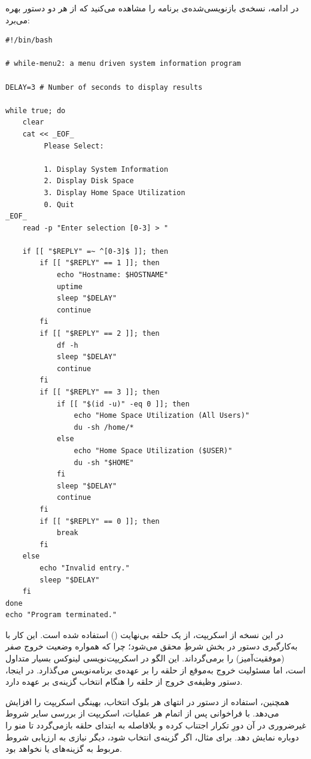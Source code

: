 در ادامه، نسخه‌ی بازنویسی‌شده‌ی برنامه  را مشاهده می‌کنید که از هر دو دستور بهره می‌برد:

\begin{latin}
\begin{lstlisting}
#!/bin/bash

# while-menu2: a menu driven system information program

DELAY=3 # Number of seconds to display results

while true; do
    clear
    cat << _EOF_
         Please Select:

         1. Display System Information
         2. Display Disk Space
         3. Display Home Space Utilization
         0. Quit
_EOF_
    read -p "Enter selection [0-3] > "

    if [[ "$REPLY" =~ ^[0-3]$ ]]; then
        if [[ "$REPLY" == 1 ]]; then
            echo "Hostname: $HOSTNAME"
            uptime
            sleep "$DELAY"
            continue
        fi
        if [[ "$REPLY" == 2 ]]; then
            df -h
            sleep "$DELAY"
            continue
        fi
        if [[ "$REPLY" == 3 ]]; then
            if [[ "$(id -u)" -eq 0 ]]; then
                echo "Home Space Utilization (All Users)"
                du -sh /home/*
            else
                echo "Home Space Utilization ($USER)"
                du -sh "$HOME"
            fi
            sleep "$DELAY"
            continue
        fi
        if [[ "$REPLY" == 0 ]]; then
            break
        fi
    else
        echo "Invalid entry."
        sleep "$DELAY"
    fi
done
echo "Program terminated."
\end{lstlisting}
\end{latin}

در این نسخه از اسکریپت، از یک حلقه بی‌نهایت () استفاده شده است. این کار با به‌کارگیری دستور  در بخش شرطِ  محقق می‌شود؛ چرا که  همواره وضعیت خروج صفر (موفقیت‌آمیز) را برمی‌گرداند. این الگو در اسکریپت‌نویسی لینوکس بسیار متداول است، اما مسئولیت خروج به‌موقع از حلقه را بر عهده‌ی برنامه‌نویس می‌گذارد. در اینجا، دستور  وظیفه‌ی خروج از حلقه را هنگام انتخاب گزینه‌ی  بر عهده دارد.

همچنین، استفاده از دستور  در انتهای هر بلوک انتخاب، بهینگی اسکریپت را افزایش می‌دهد. با فراخوانی  پس از اتمام هر عملیات، اسکریپت از بررسی سایر شروط غیرضروری در آن دورِ تکرار اجتناب کرده و بلافاصله به ابتدای حلقه بازمی‌گردد تا منو را دوباره نمایش دهد. برای مثال، اگر گزینه‌ی  انتخاب شود، دیگر نیازی به ارزیابی شروط مربوط به گزینه‌های  یا  نخواهد بود.

